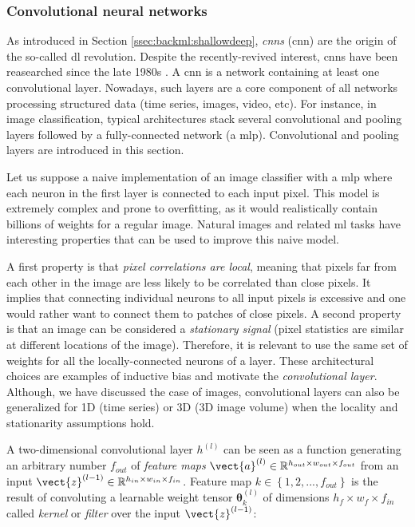 \subsubsection{Convolutional neural networks}
\label{sssec:backml:dl:cnn}

As introduced in Section \ref{ssec:backml:shallowdeep}, \textit{\acrlong{cnn}s} (\acrshort{cnn}) are the origin of the so-called \acrlong{dl} revolution. Despite the recently-revived interest, \acrshort{cnn}s have been reasearched since the late 1980s \parencite{lecun1989handwritten}. A \acrshort{cnn} is a network containing at least one convolutional layer. Nowadays, such layers are a core component of all networks processing structured data (time series, images, video, etc). For instance, in image classification, typical architectures stack several convolutional and pooling layers followed by a fully-connected network (\ie a \acrshort{mlp}). Convolutional and pooling layers are introduced in this section.

Let us suppose a naive implementation of an image classifier with a \acrshort{mlp} where each neuron in the first layer is connected to each input pixel. This model is extremely complex and prone to overfitting, as it would realistically contain billions of weights for a regular image. Natural images and related \acrlong{ml} tasks have interesting properties that can be used to improve this naive model. 

A first property is that \textit{pixel correlations are local}, meaning that pixels far from each other in the image are less likely to be correlated than close pixels. It implies that connecting individual neurons to all input pixels is excessive and one would rather want to connect them to patches of close pixels. A second property is that an image can be considered a \textit{stationary signal} (\ie pixel statistics are similar at different locations of the image). Therefore, it is relevant to use the same set of weights for all the locally-connected neurons of a layer. These architectural choices are examples of inductive bias and motivate the \textit{convolutional layer}. Although, we have discussed the case of images, convolutional layers can also be generalized for 1D (\eg time series) or 3D (\eg 3D image volume) when the locality and stationarity assumptions hold.   

A two-dimensional convolutional layer $h^{(l)}$ can be seen as a function generating an arbitrary number $f_{out}$ of \textit{feature maps} $\vect{a}^{(l)} \in \mathbb{R}^{h_{out} \times w_{out} \times f_{out}}$ from an input $\vect{z}^{(l-1)} \in \mathbb{R}^{h_{in} \times w_{in} \times f_{in}}$. Feature map $k \in \left\{1, 2, ..., f_{out}\right\}$ is the result of convoluting a learnable weight tensor $\pmb{\theta}^{(l)}_k$ of dimensions $h_f \times w_f \times f_{in}$ called \textit{kernel} or \textit{filter} over the input $\vect{z}^{(l-1)}$:

